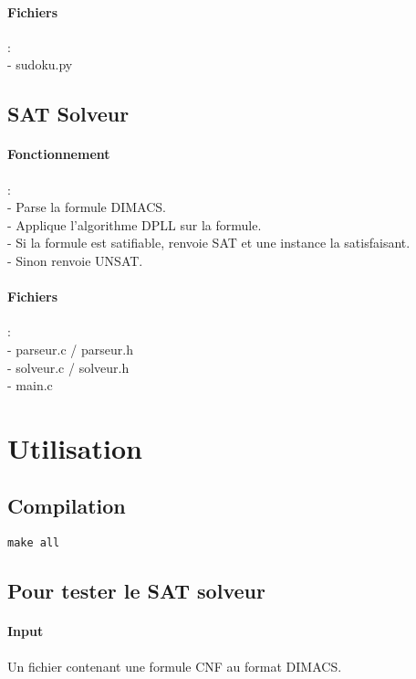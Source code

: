 \documentclass{report}
\begin{document}
\paragraph{Fichiers}:\\
- sudoku.py

\subsection{SAT Solveur}

\paragraph{Fonctionnement}:\\
- Parse la formule DIMACS. \\
- Applique l'algorithme DPLL sur la formule. \\
- Si la formule est satifiable, renvoie SAT et une instance la satisfaisant. \\
- Sinon renvoie UNSAT.

\paragraph{Fichiers}:\\
- parseur.c / parseur.h \\
- solveur.c / solveur.h \\
- main.c


\section{Utilisation}

\subsection{Compilation}
\begin{verbatim}
make all
\end{verbatim}

\subsection{Pour tester le SAT solveur}

\paragraph{Input}
Un fichier contenant une formule CNF au format DIMACS.
\end{document}
